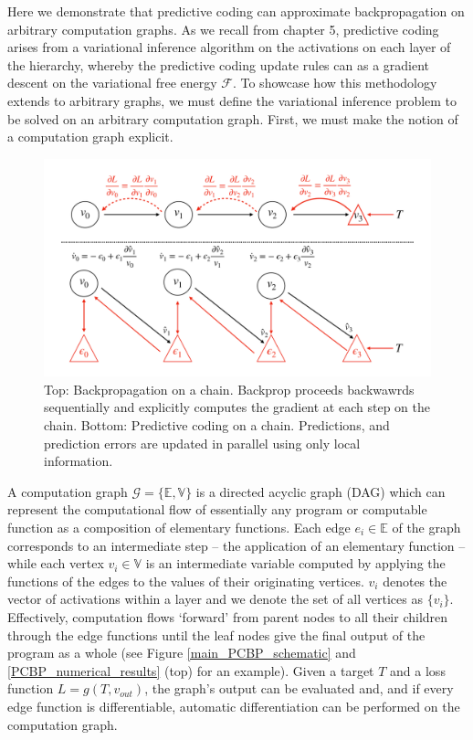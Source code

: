 Here we demonstrate that predictive coding can approximate backpropagation on arbitrary computation graphs. As we recall from chapter 5, predictive coding arises from a variational inference algorithm on the activations on each layer of the hierarchy, whereby the predictive coding update rules can as a gradient descent on the variational free energy $\mathcal{F}$. To showcase how this methodology extends to arbitrary graphs, we must define the variational inference problem to be solved on an arbitrary computation graph. First, we must make the notion of a computation graph explicit. 

\begin{figure}[ht]
\label{main_PCBP_schematic}
    \centering
    \includegraphics[width=\textwidth]{chapter_6_figures/pc_chain_schematic_new.pdf}
    \caption{Top: Backpropagation on a chain. Backprop proceeds backwawrds sequentially and  explicitly computes the gradient at each step on the chain. Bottom: Predictive coding on a chain.  Predictions, and prediction errors are updated in parallel using only local information.}
    \label{fig:my_label}
\end{figure}

A computation graph $\mathcal{G} = \{\mathbb{E},\mathbb{V}\}$ is a directed acyclic graph (DAG) which can represent the computational flow of essentially any program or computable function as a composition of elementary functions. Each edge $e_i \in \mathbb{E}$ of the graph corresponds to an intermediate step -- the application of an elementary function -- while each vertex $v_i \in \mathbb{V}$ is an intermediate variable computed by applying the functions of the edges to the values of their originating vertices. $v_i$ denotes the vector of activations within a layer and we denote the set of all vertices as $\{v_i\}$. Effectively, computation flows `forward' from parent nodes to all their children through the edge functions until the leaf nodes give the final output of the program as a whole (see Figure \ref{main_PCBP_schematic} and \ref{PCBP_numerical_results} (top) for an example). Given a target $T$ and a loss function $L = g(T, v_{out})$, the graph's output can be evaluated and, and if every edge function is differentiable, automatic differentiation can be performed on the computation graph.

